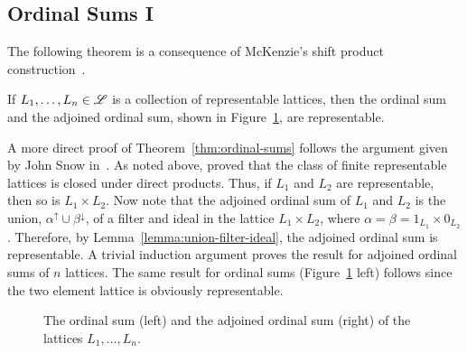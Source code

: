 \subsection{Ordinal Sums I}
\label{sec:ordinal-sums}

The following theorem is a consequence of 
McKenzie's shift product construction~\cite{McKenzie:1984}. %
\begin{theorem}
  \label{thm:ordinal-sums}
  If $L_1, \dots, L_n \in \mathscr{L}$ is a collection of representable lattices, then
  the ordinal sum and the adjoined ordinal sum, shown in
  Figure~\ref{fig:adjordinal}, are representable.
\end{theorem}
A more direct proof of Theorem~\ref{thm:ordinal-sums} follows the argument given
by John Snow in~\cite{Snow:2000}.  As noted above, 
\Jiri \Tuma proved that
the class of finite representable lattices is closed under direct products.
Thus, if $L_1$ and 
$L_2$ are representable, then so is $L_1 \times L_2$.  Now note that the
adjoined ordinal sum of $L_1$ and $L_2$ is the union, $\alpha^\uparrow \cup
\beta^\downarrow$,  of a filter and ideal  
in the lattice $L_1 \times L_2$, where
$\alpha = \beta = 1_{L_1} \times 0_{L_2}$.  
Therefore, by Lemma~\ref{lemma:union-filter-ideal},
the adjoined ordinal sum is representable.  A trivial induction argument proves the
result for adjoined ordinal sums of $n$ lattices.  The same result for ordinal
sums (Figure~\ref{fig:adjordinal} left) follows since the two element lattice is
obviously representable. 

\begin{center}
  \begin{figure}[h!]
    \label{fig:adjordinal}
    \centering
        {
          \hskip1cm
        }
        \caption{The ordinal sum (left) and the adjoined ordinal sum (right) of the lattices
          $L_1, \dots, L_n$.}
  \end{figure}
\end{center}


